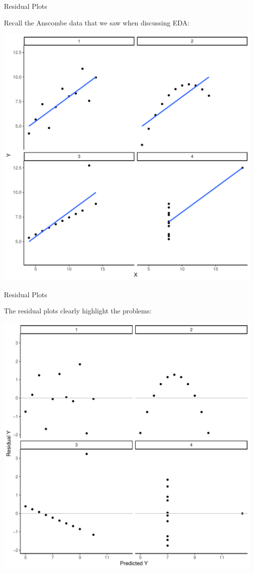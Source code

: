 \documentclass{beamer}\usepackage[]{graphicx}\usepackage[]{color}
\newenvironment{knitrout}{}{} %
\begin{document}
\begin{frame}{Residual Plots}
  
  Recall the Anscombe data that we saw when discussing EDA:
  \va

\begin{knitrout}\footnotesize
{}\color{fgcolor}

{\centering \includegraphics[width=0.5\linewidth]{figure/unnamed-chunk-3-1} 

}



\end{knitrout}
 
\end{frame}


\begin{frame}{Residual Plots}
  
  The residual plots clearly highlight the problems:

\va

\begin{knitrout}\footnotesize
{}\color{fgcolor}

{\centering \includegraphics[width=0.5\linewidth]{figure/unnamed-chunk-4-1} 

}



\end{knitrout}

\end{frame}
\end{document}
